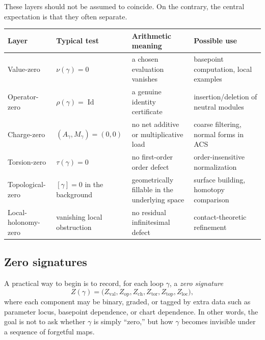 \documentclass[11pt]{article}
\newcommand{\Id}{\operatorname{Id}}
\newcommand{\ACS}{ACS}
\begin{document}
These layers should not be assumed to coincide. On the contrary, the central expectation is that they often separate.

\begin{center}
\renewcommand{\arraystretch}{1.25}
\begin{tabular}{>{\raggedright\arraybackslash}p{} >{\raggedright\arraybackslash}p{} >{\raggedright\arraybackslash}p{} >{\raggedright\arraybackslash}p{}}
\toprule
\textbf{Layer} & \textbf{Typical test} & \textbf{Arithmetic meaning} & \textbf{Possible use} \\
\midrule
Value-zero & $\nu(\gamma)=0$ & a chosen evaluation vanishes & basepoint computation, local examples \\
Operator-zero & $\rho(\gamma)=\Id$ & a genuine identity certificate & insertion/deletion of neutral modules \\
Charge-zero & $(A_\gamma,M_\gamma)=(0,0)$ & no net additive or multiplicative load & coarse filtering, normal forms in \ACS{} \\
Torsion-zero & $\tau(\gamma)=0$ & no first-order order defect & order-insensitive normalization \\
Topological-zero & $[\gamma]=0$ in the background & geometrically fillable in the underlying space & surface building, homotopy comparison \\
Local-holonomy-zero & vanishing local obstruction & no residual infinitesimal defect & contact-theoretic refinement \\
\bottomrule
\end{tabular}
\end{center}

\subsection{Zero signatures}

A practical way to begin is to record, for each loop $\gamma$, a \emph{zero signature}
\begin{equation}
Z(\gamma)=\bigl(Z_{\mathrm{val}}, Z_{\mathrm{op}}, Z_{\mathrm{ch}}, Z_{\mathrm{tor}}, Z_{\mathrm{top}}, Z_{\mathrm{loc}}\bigr),
\end{equation}
where each component may be binary, graded, or tagged by extra data such as parameter locus, basepoint dependence, or chart dependence. In other words, the goal is not to ask whether $\gamma$ is simply ``zero,'' but how $\gamma$ becomes invisible under a sequence of forgetful maps.
\end{document}
